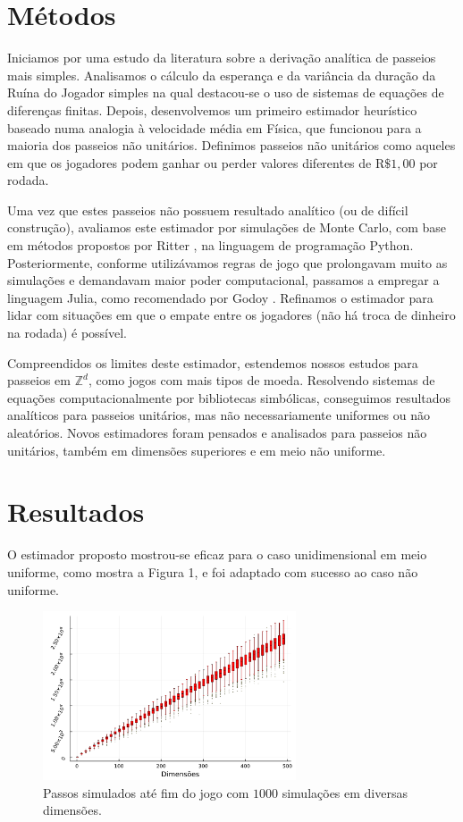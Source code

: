 \documentclass[a4paper,10pt,twocolumn]{article}
\begin{document}
\section{Métodos}

Iniciamos por uma estudo da literatura sobre a derivação analítica de passeios
mais simples. Analisamos o cálculo da esperança e da variância da duração da
Ruína do Jogador simples \cite{andel_variance_2012} na qual destacou-se o uso de
sistemas de equações de diferenças finitas. Depois, desenvolvemos um primeiro
estimador heurístico baseado numa analogia à velocidade média em Física, que
funcionou para a maioria dos passeios não unitários. Definimos passeios não
unitários como aqueles em que os jogadores podem ganhar ou perder valores
diferentes de $\mathrm{R}\$1,00$ por rodada.

Uma vez que estes passeios não possuem resultado analítico (ou de difícil
construção), avaliamos este estimador por simulações de Monte Carlo, com base em
métodos propostos por Ritter \cite{ritter_determining_2011}, na linguagem de
programação Python. Posteriormente, conforme utilizávamos regras de jogo que
prolongavam muito as simulações e demandavam maior poder computacional, passamos
a empregar a linguagem Julia, como recomendado por Godoy
\cite{godoy_evaluating_2023}. Refinamos o estimador para lidar com situações em
que o empate entre os jogadores (não há troca de dinheiro na rodada) é
possível.

Compreendidos os limites deste estimador, estendemos nossos estudos para
passeios em $\mathbb{Z}^d$, como jogos com mais tipos de moeda. Resolvendo
sistemas de equações computacionalmente por bibliotecas simbólicas, conseguimos
resultados analíticos para passeios unitários, mas não necessariamente uniformes
ou não aleatórios. Novos estimadores foram pensados e analisados para passeios
não unitários, também em dimensões superiores e em meio não uniforme.

\section{Resultados}

O estimador proposto mostrou-se eficaz para o caso unidimensional em meio
uniforme, como mostra a Figura 1, e foi adaptado com sucesso ao caso não
uniforme.

\begin{figure}[h]
    \caption{Passos simulados até fim do jogo com $1000$ simulações em diversas
    dimensões.}
    \centering
    \includegraphics[width=7.5cm]{"boxplots.pdf"}
\end{figure}
\end{document}
